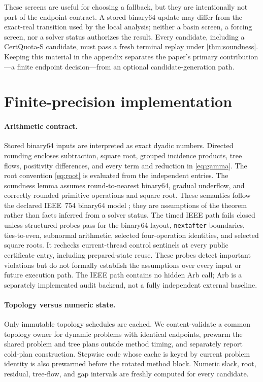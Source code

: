 \documentclass[smallextended,envcountsect]{svjour3}
\begin{document}
These screens are useful for choosing a fallback, but they are intentionally
not part of the endpoint contract.  A stored binary64 update may differ from
the exact-real transition used by the local analysis; neither a basin screen,
a forcing screen, nor a solver status authorizes the result.  Every candidate,
including a CertQuota-S candidate, must pass a fresh terminal replay under
\cref{thm:soundness}.  Keeping this material in the appendix separates the
paper's primary contribution---a finite endpoint decision---from an optional
candidate-generation path.

\section{Finite-precision implementation}
\label{sec:implementation}

\paragraph{Arithmetic contract.}
Stored binary64 inputs are interpreted as exact dyadic numbers.  Directed
rounding encloses subtraction, square root, grouped incidence products, tree
flows, positivity differences, and every term and reduction in
\cref{eq:gamma}.  The root convention \cref{eq:root} is evaluated from the
independent entries.  The soundness lemma assumes round-to-nearest binary64,
gradual underflow, and correctly rounded primitive operations and square root.
These semantics follow the declared IEEE~754 binary64 model
\citep{ieee7542019}; they are assumptions of the theorem rather than facts
inferred from a solver status.
The timed IEEE path fails closed unless structured probes pass for the binary64
layout, \texttt{nextafter} boundaries, ties-to-even, subnormal arithmetic,
selected four-operation identities, and selected square roots.  It rechecks
current-thread control sentinels at every public certificate entry, including
prepared-state reuse.  These probes detect important violations but do not
formally establish the assumptions over every input or future execution path.
The IEEE path contains no hidden Arb call; Arb is a separately implemented
audit backend, not a fully independent external baseline.

\paragraph{Topology versus numeric state.}
Only immutable topology schedules are cached.  We content-validate a common
topology owner for dynamic problems with identical endpoints, prewarm the shared
problem and tree plans outside method timing, and separately report cold-plan
construction.  Stepwise code whose cache is keyed by current problem identity is
also prewarmed before the rotated method block.  Numeric slack, root, residual,
tree-flow, and gap intervals are freshly computed for every candidate.
\end{document}
